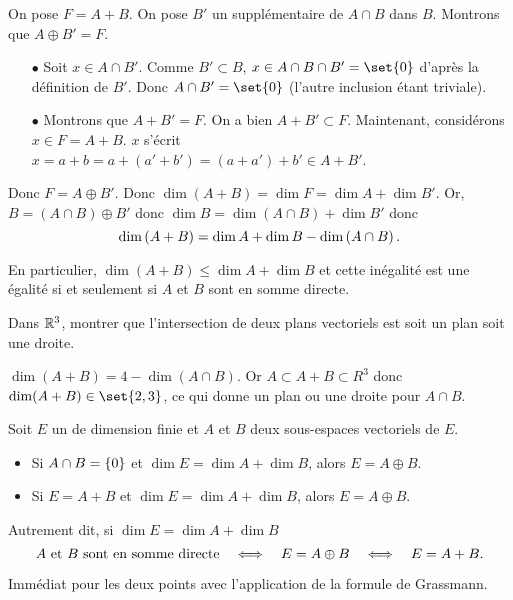 \documentclass{magnolia}
\begin{document}
\begin{preuve}
On pose $F=A+B$.
On pose $B'$ un supplémentaire de $A\cap B$ dans $B$. Montrons que $A\oplus B'=F$.
\begin{itemize}
\item[$\bullet$] Soit $x\in A\cap B'$. Comme $B'\subset B$, $x\in A\cap B\cap B'=\set{0}$ d'après la définition de $B'$. Donc $A\cap B'=\set{0}$ (l'autre inclusion étant triviale).
\item[$\bullet$] Montrons que $A+B'=F$. On a bien $A+B'\subset F$. Maintenant, considérons $x\in F=A+B$. $x$ s'écrit $x=a+b=a+(a'+b')=(a+a')+b' \in A+B'$.
\end{itemize}
Donc $F=A\oplus B'$. Donc $\dim(A+B)=\dim F=\dim A+\dim B'$. Or, $B=(A\cap B)\oplus B'$ donc $\dim B=\dim(A\cap B)+\dim B'$ donc $$\dim\left(A+B\right)=\dim A+\dim B-\dim\left(A\cap B\right).$$
\end{preuve}

\begin{remarqueUnique}
\remarque En particulier, $\dim(A+B)\leq\dim A+\dim B$ et cette inégalité est
  une égalité si et seulement si $A$ et $B$ sont en somme directe.
\end{remarqueUnique}
\begin{exos}
\exo Dans $\mathbb{R}^3$, montrer que l'intersection de deux plans vectoriels est soit un
  plan soit une droite.
  \begin{sol}
  $\dim(A+B)=4-\dim(A\cap B)$. Or $A\subset A+B\subset R^3$ donc $\dim(A+B)\in \set{2,3}$, ce qui donne un plan ou une droite pour $A\cap B$.
  \end{sol}
\end{exos}

\begin{proposition}[utile=3]
Soit $E$ un \Kev de dimension finie et $A$ et $B$ deux sous-espaces vectoriels
de $E$.
\begin{itemize}
\item Si $A\cap B=\left\{0\right\}$ et $\dim E=\dim A+\dim B$, alors $E=A\oplus B$.
\item Si $E=A+B$ et $\dim E=\dim A+\dim B$, alors $E=A\oplus B$.
\end{itemize}
Autrement dit, si $\dim E=\dim A+\dim B$
\[\text{$A$ et $B$ sont en somme directe} \quad\Longleftrightarrow\quad
  E=A\oplus B \quad\Longleftrightarrow\quad E=A+B.\]

\end{proposition}

\begin{preuve}
Immédiat pour les deux points avec l'application de la formule de Grassmann.
\end{preuve}
\end{document}
